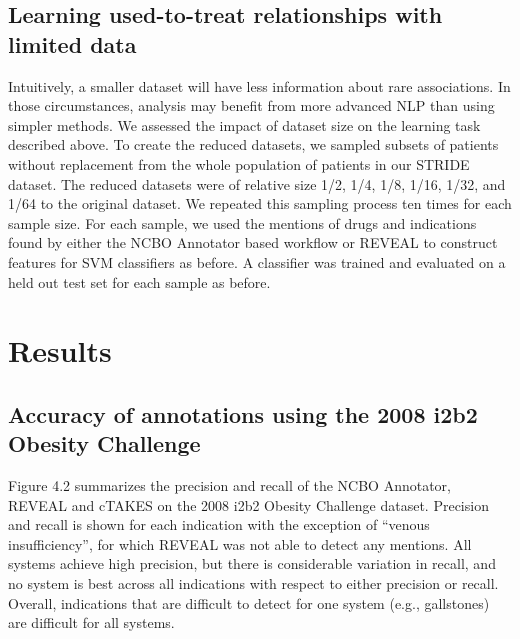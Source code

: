 \subsection{Learning used-to-treat relationships with limited data}
Intuitively, a smaller dataset will have less information about rare
associations.  In those circumstances, analysis may benefit from more
advanced NLP than using simpler methods.  We assessed the impact of
dataset size on the learning task described above.  To create the
reduced datasets, we sampled subsets of patients without replacement
from the whole population of patients in our STRIDE dataset.  The
reduced datasets were of relative size 1/2, 1/4, 1/8, 1/16, 1/32, and
1/64 to the original dataset.  We repeated this sampling process ten
times for each sample size.  For each sample, we used the mentions of
drugs and indications found by either the NCBO Annotator based
workflow or REVEAL to construct features for SVM classifiers as
before.  A classifier was trained and evaluated on a held out test set
for each sample as before.

\section{Results}
\subsection{Accuracy of annotations using the 2008 i2b2 Obesity Challenge}
Figure 4.2 summarizes the precision and recall of the NCBO Annotator,
REVEAL and cTAKES on the 2008 i2b2 Obesity Challenge dataset.
Precision and recall is shown for each indication with the exception
of “venous insufficiency”, for which REVEAL was not able to detect any
mentions.  All systems achieve high precision, but there is
considerable variation in recall, and no system is best across all
indications with respect to either precision or recall.  Overall,
indications that are difficult to detect for one system (e.g.,
gallstones) are difficult for all systems.


